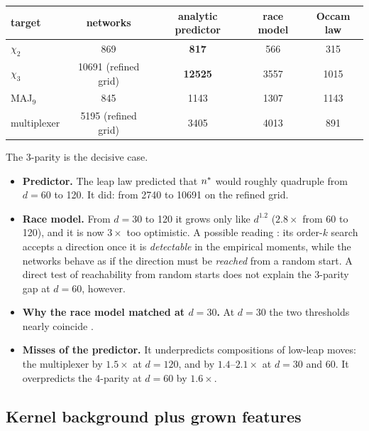 \begin{center}\small
\begin{tabular}{lcccc}
\toprule
target & networks & analytic predictor & race model & Occam law\\
\midrule
$\chi_2$ & 869 & \textbf{817} & 566 & 315\\
$\chi_3$ & 10691 (refined grid) & \textbf{12525} & 3557 & 1015\\
MAJ$_9$ & 845 & 1143 & 1307 & 1143\\
multiplexer & 5195 (refined grid) & 3405 & 4013 & 891\\
\bottomrule
\end{tabular}
\end{center}
The 3-parity is the decisive case.
\begin{itemize}
\item \textbf{Predictor.} The leap law predicted that $n^{*}$ would roughly quadruple from $d=60$ to 120. It did: from 2740 to 10691 on the refined grid.
\item \textbf{Race model.} From $d=30$ to 120 it grows only like $d^{1.2}$ ($2.8\times$ from 60 to 120), and it is now $3\times$ too optimistic. A possible reading : its order-$k$ search accepts a direction once it is \emph{detectable} in the empirical moments, while the networks behave as if the direction must be \emph{reached} from a random start. A direct test of reachability from random starts does not explain the 3-parity gap at $d=60$, however.
\item \textbf{Why the race model matched at $d=30$.} At $d=30$ the two thresholds nearly coincide .
\item \textbf{Misses of the predictor.} It underpredicts compositions of low-leap moves: the multiplexer by $1.5\times$ at $d=120$, and by $1.4$–$2.1\times$ at $d=30$ and 60. It overpredicts the 4-parity at $d=60$ by $1.6\times$.
\end{itemize}

\subsection{Kernel background plus grown features}\label{sec:hybrid}

